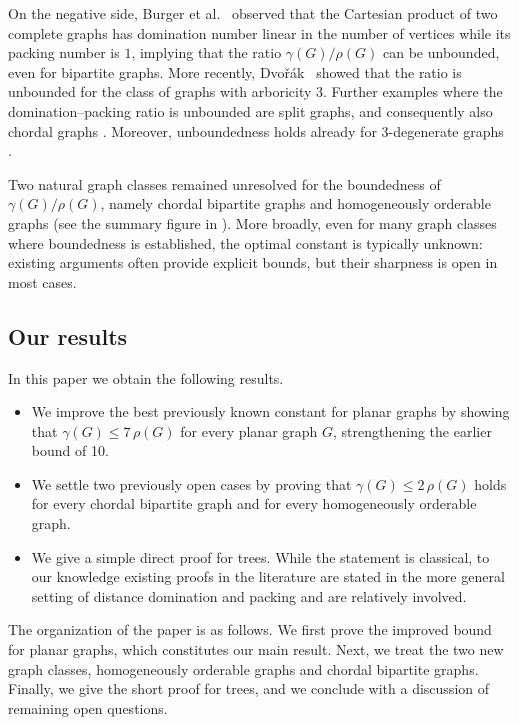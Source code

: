 \documentclass[a4paper, 12pt]{article}
\begin{document}
On the negative side, Burger et al.~\cite{Burger09} observed that the Cartesian product of two complete graphs has domination number linear in the number of vertices while its packing number is $1$, implying that the ratio $\gamma(G)/\rho(G)$ can be unbounded, even for bipartite graphs. More recently, Dvořák~\cite{Dvorak19} showed that the ratio is unbounded for the class of graphs with arboricity 3.
Further examples where the domination--packing ratio is unbounded are split graphs, and consequently also chordal graphs \cite{bonamy2025graph}. Moreover, unboundedness holds already for $3$-degenerate graphs \cite{Dvorak13}.

Two natural graph classes remained unresolved for the boundedness of $\gamma(G)/\rho(G)$, namely chordal bipartite graphs and homogeneously orderable graphs (see the summary figure in \cite{bonamy2025graph}).
More broadly, even for many graph classes where boundedness is established, the optimal constant is typically unknown: existing arguments often provide explicit bounds, but their sharpness is open in most cases.


\subsection{Our results}
In this paper we obtain the following results.
\begin{itemize}
    \item We improve the best previously known constant for planar graphs by showing that
    $\gamma(G)\le 7\,\rho(G)$ for every planar graph $G$, strengthening the earlier bound of 10.
    
    \item We settle two previously open cases by proving that $\gamma(G)\le 2\,\rho(G)$ holds for
    every chordal bipartite graph and for every homogeneously orderable graph.
    
    \item We give a simple direct proof for trees. While the statement is classical, to our
    knowledge existing proofs in the literature are stated in the more general setting of
    distance domination and packing and are relatively involved.
\end{itemize}

The organization of the paper is as follows. We first prove the improved bound for planar graphs, which constitutes our main result. Next, we treat the two new graph classes, homogeneously orderable graphs and chordal bipartite graphs. Finally, we give the short proof for trees, and we conclude with a discussion of remaining open
questions.
\end{document}
